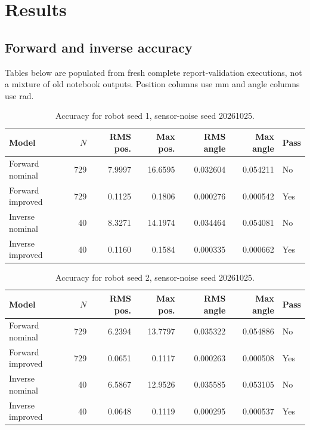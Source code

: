 \documentclass[11pt]{article}
\begin{document}
\section{Results}
\subsection{Forward and inverse accuracy}
Tables below are populated from fresh complete report-validation executions, not a mixture of old notebook outputs. Position columns use mm and angle columns use rad.
\begin{table}[H]\centering\small
\caption{Accuracy for robot seed 1, sensor-noise seed 20261025.}
\begin{tabular}{@{}lrrrrrl@{}}\toprule
Model & $N$ & RMS pos. & Max pos. & RMS angle & Max angle & Pass\\\midrule

Forward nominal & 729 & 7.9997 & 16.6595 & 0.032604 & 0.054211 & No\\

Forward improved & 729 & 0.1125 & 0.1806 & 0.000276 & 0.000542 & Yes\\

Inverse nominal & 40 & 8.3271 & 14.1974 & 0.034464 & 0.054081 & No\\

Inverse improved & 40 & 0.1160 & 0.1584 & 0.000335 & 0.000662 & Yes\\

\bottomrule\end{tabular}\end{table}

\begin{table}[H]\centering\small
\caption{Accuracy for robot seed 2, sensor-noise seed 20261025.}
\begin{tabular}{@{}lrrrrrl@{}}\toprule
Model & $N$ & RMS pos. & Max pos. & RMS angle & Max angle & Pass\\\midrule

Forward nominal & 729 & 6.2394 & 13.7797 & 0.035322 & 0.054886 & No\\

Forward improved & 729 & 0.0651 & 0.1117 & 0.000263 & 0.000508 & Yes\\

Inverse nominal & 40 & 6.5867 & 12.9526 & 0.035585 & 0.053105 & No\\

Inverse improved & 40 & 0.0648 & 0.1119 & 0.000295 & 0.000537 & Yes\\

\bottomrule\end{tabular}\end{table}
\end{document}

